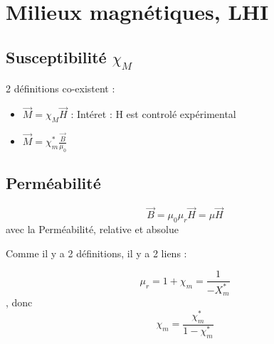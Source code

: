 \documentclass[french]{yLectureNote}
\renewcommand{\vec}{\overrightarrow}
\begin{document}
\section{Milieux magnétiques, LHI}
\subsection{Susceptibilité $\chi_M$}
2 définitions co-existent :
\begin{itemize}
    \item $\vec{M} = \chi_M \vec{H}$ : Intéret : H est controlé expérimental
    \item $\vec{M} = \chi_m^*\frac{\vec{B}}{\mu_0}$
\end{itemize}
\subsection{Perméabilité}
\begin{definition}[Perméabilité]
    $$\vec{B} = \mu_0\mu_r \vec{H} = \mu\vec{H}$$ avec la Perméabilité, relative et absolue
\end{definition}
Comme il y a 2 définitions, il y a 2 liens :
\begin{definition}[Expression de $\mu_r$]
    $$\mu_r = 1+\chi_m = \frac{1}{-X_m^*}$$, donc $$\chi_m = \frac{\chi_m^*}{1-\chi_m^*}$$
\end{definition}

\end{document}
